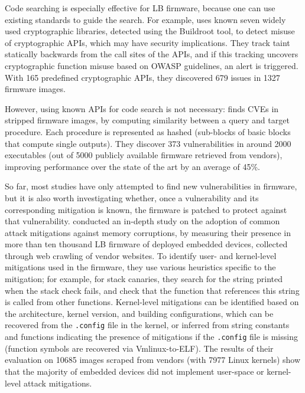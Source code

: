 Code searching is especially effective for LB firmware, because one can use existing standards to guide the search.
For example,  uses known seven widely used cryptographic libraries, detected using the Buildroot tool, to detect misuse of cryptographic APIs, which may have security implications.
They track taint statically backwards from the call sites of the APIs, and if this tracking uncovers cryptographic function misuse based on OWASP guidelines, an alert is triggered.
With \num{165} predefined cryptographic APIs, they discovered \num{679} issues in \num{1327} firmware images.

However, using known APIs for code search is not necessary:  finds CVEs in stripped firmware images, by computing similarity between a query and target procedure.
Each procedure is represented as hashed  (sub-blocks of basic blocks that compute single outputs).
They discover \num{373} vulnerabilities in around \num{2000} executables (out of \num{5000} publicly available firmware retrieved from vendors), improving performance over the state of the art  by an average of 45\%.

So far, most studies have only attempted to find new vulnerabilities in firmware, but it is also worth investigating whether, once a vulnerability and its corresponding mitigation is known, the firmware is patched to protect against that vulnerability.
 conducted an in-depth study on the adoption of common attack mitigations against memory corruptions, by measuring their presence in more than ten thousand LB firmware of deployed embedded devices, collected through web crawling of vendor websites.
To identify user- and kernel-level mitigations used in the firmware, they use various heuristics specific to the mitigation; for example, for stack canaries, they search for the string printed when the stack check fails, and check that the function that references this string is called from other functions.
Kernel-level mitigations can be identified based on the architecture, kernel version, and building configurations, which can be recovered from the \texttt{.config} file in the kernel, or inferred from string constants and functions indicating the presence of mitigations if the \texttt{.config} file is missing (function symbols are recovered via Vmlinux-to-ELF).
The results of their evaluation on \num{10685} images scraped from vendors (with \num{7977} Linux kernels) show that the majority of embedded devices did not implement user-space or kernel-level attack mitigations.

